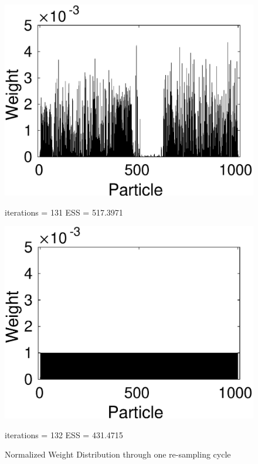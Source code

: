 \documentclass[12pt]{article}
\begin{document}
\begin{figure}[h!]
\begin{minipage}{0.5\textwidth}
		\includegraphics[scale = 0.5]{./Figures/131.eps}
		\caption*{iterations = 131 ESS = 517.3971}
	\end{minipage}%
	\begin{minipage}{0.5\textwidth}
		\centering
		\includegraphics[scale = 0.5]{./Figures/132resampled.eps}
		\caption*{iterations = 132 ESS = 431.4715}
	\end{minipage}%
	\caption{Normalized Weight Distribution through one re-sampling cycle}
\end{figure}

\newpage
\end{document}
